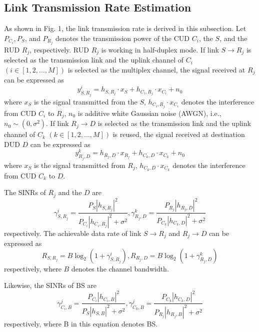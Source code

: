 \documentclass[conference]{IEEEtran}
\begin{document}
\subsection{Link Transmission Rate Estimation}
As shown in Fig. 1, the link transmission rate is derived in this subsection. Let $P_{C_i},P_S$, and $P_{R_j}$ denotes the transmission power of the CUD $C_i$, the $S$, and the RUD $R_j$, respectively. RUD $R_j$ is working in half-duplex mode. If link $S \rightarrow R_j$ is selected as the transmission link and the uplink channel of $C_i$ $(i \in [1,2,\ldots,M])$ is selected as the multiplex channel, the signal received at $R_j$ can be expressed as
\begin{equation}
y^i_{S,R_j} = h_{S,R_j}\cdot x_S + h_{C_i,R_j}\cdot x_{C_i} + n_0
\end{equation}
where $x_S$ is the signal transmitted from the $S$, $h_{C_i,R_j}\cdot x_{C_i}$ denotes the interference from CUD $C_i$ to $R_j$, $n_0$ is additive white Gaussian noise (AWGN), i.e., $n_0 \sim (0,\sigma^2)$. If link $R_j \rightarrow D$ is selected as the transmission link and the uplink channel of $C_k$ $(k \in [1,2,\ldots,M])$ is reused, the signal received at destination DUD $D$ can be expressed as
\begin{equation}
y^k_{R_j,D} = h_{R_j,D}\cdot x_{R_j} + h_{C_k,D}\cdot x_{C_k} + n_0
\end{equation}
where $x_S$ is the signal transmitted from $R_j$, $h_{C_k,D}\cdot x_{C_k}$ denotes the interference from CUD $C_k$ to $D$.

The SINRs of $R_j$ and the $D$ are
\begin{equation}
\gamma^{i}_{S,R_j} = \frac{P_S|{h_{S,R_j}}|^{2}}{P_{C_i}|{h_{C_i,R_j}}|^{2} + \sigma^2} ,\gamma^{k}_{R_j,D} = \frac{P_{R_j}|{h_{R_j,D}}|^{2}}{P_{C_k}|{h_{C_k,D}}|^{2} + \sigma^2}
\end{equation}
respectively. The achievable data rate of link $S \rightarrow R_j$ and $R_j \rightarrow D$ can be expressed as
\begin{equation}
R_{S,R_j} = B\log_2(1 + \gamma^{i}_{S,R_{j}}),R_{R_j,D} = B\log_2(1 + \gamma^{k}_{R_j,D})
\end{equation}
respectively, where $B$ denotes the channel bandwidth.

Likewise, the SINRs of BS are
\begin{equation}
\gamma^{j}_{C_i,B} = \frac{P_{C_i}|{h_{C_i,B}}|^{2}}{P_S|{h_{S,B}}|^{2} + \sigma^2} ,\gamma^{j}_{C_k,B} = \frac{P_{C_k}|{h_{C_k,D}}|^{2}}{P_{R_j}|{h_{R_j,B}}|^{2} + \sigma^2}
\end{equation}
respectively, where B in this equation denotes BS.
\end{document}
